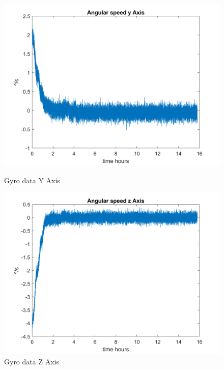 \begin{itemize}
\begin{figure}[H]
\begin{minipage}{0.32\linewidth}
            \includegraphics[width=0.95\linewidth]{res/img/Nadir_EKF/Simulations/Gyro data Y Axis.png}
            \caption{Gyro data Y Axis}
            \label{fig:GyroDataY}
        \end{minipage}\hfill
        \begin{minipage}{0.32\linewidth}
            \centering
            \includegraphics[width=0.95\linewidth]{res/img/Nadir_EKF/Simulations/Gyro data Z Axis.png}
            \caption{Gyro data Z Axis}
            \label{fig:GyroDataZ}
        \end{minipage}
    \end{figure}


\end{itemize}
